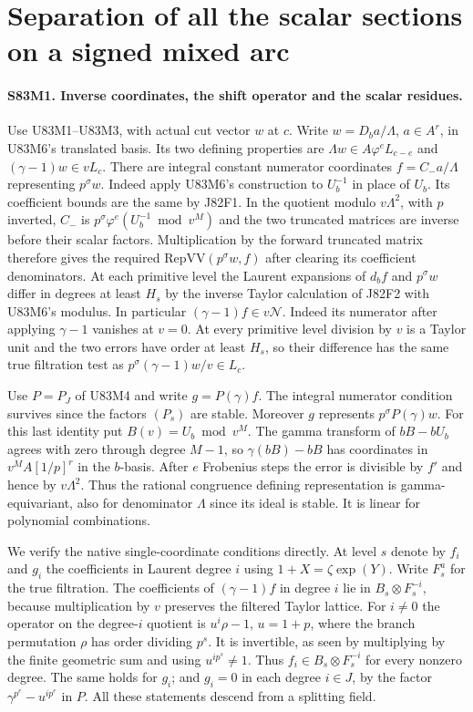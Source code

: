\section{Separation of all the scalar sections on a signed mixed arc}

\paragraph{S83M1. Inverse coordinates, the shift operator and the scalar residues.}
Use U83M1--U83M3, with actual cut vector $w$ at $c$. Write
$w=D_b a/\Lambda$, $a\in A^r$, in U83M6's translated basis.
Its two defining properties are $\Lambda w\in A\varphi^e L_{c-e}$
and $(\gamma-1)w\in vL_c$. There are integral constant numerator
coordinates $f=C_- a/\Lambda$ representing $p^\sigma w$.
Indeed apply U83M6's construction to $U_b^{-1}$ in place of
$U_b$. Its coefficient bounds are the same by J82F1. In the
quotient modulo $v\Lambda^2$, with $p$ inverted, $C_-$ is
$p^\sigma\varphi^e(U_b^{-1}\bmod v^M)$ and the two truncated
matrices are inverse before their scalar factors. Multiplication
by the forward truncated matrix therefore gives the required
$\mathrm{RepVV}(p^\sigma w,f)$ after clearing its coefficient
denominators. At each primitive level the Laurent expansions of
$d_bf$ and $p^\sigma w$ differ in degrees at least $H_s$ by the
inverse Taylor calculation of J82F2 with U83M6's modulus.
In particular $(\gamma-1)f\in v\mathcal N$. Indeed its numerator
after applying $\gamma-1$ vanishes at $v=0$. At every primitive
level division by $v$ is a Taylor unit and the two errors have
order at least $H_s$, so their difference has the same true
filtration test as $p^\sigma(\gamma-1)w/v\in L_c$.

Use $P=P_J$ of U83M4 and write $g=P(\gamma)f$. The integral
numerator condition survives since the factors $(P_s)$ are stable.
Moreover $g$ represents $p^\sigma P(\gamma)w$. For this last
identity put $B(v)=U_b\bmod v^M$. The gamma transform of $bB-bU_b$
agrees with zero through degree $M-1$, so $\gamma(bB)-bB$ has
coordinates in $v^M A[1/p]^r$ in the $b$-basis. After $e$
Frobenius steps the error is divisible by $f'$ and hence by
$v\Lambda^2$. Thus the rational congruence defining representation
is gamma-equivariant, also for denominator $\Lambda$ since its
ideal is stable. It is linear for polynomial combinations.

We verify the native single-coordinate conditions directly. At
level $s$ denote by $f_i$ and $g_i$ the coefficients in Laurent
degree $i$ using $1+X=\zeta\exp(Y)$. Write $F_s^a$ for the
true filtration. The coefficients of $(\gamma-1)f$ in degree
$i$ lie in $B_s\otimes F_s^{-i}$, because multiplication by
$v$ preserves the filtered Taylor lattice. For $i\ne0$ the
operator on the degree-$i$ quotient is $u^i\rho-1$, $u=1+p$,
where the branch permutation $\rho$ has order dividing $p^s$.
It is invertible, as seen by multiplying by the finite geometric
sum and using $u^{ip^s}\ne1$. Thus $f_i\in B_s\otimes F_s^{-i}$
for every nonzero degree. The same holds for $g_i$; and $g_i=0$
in each degree $i\in J$, by the factor $\gamma^{p^e}-u^{ip^e}$
in $P$. All these statements descend from a splitting field.

